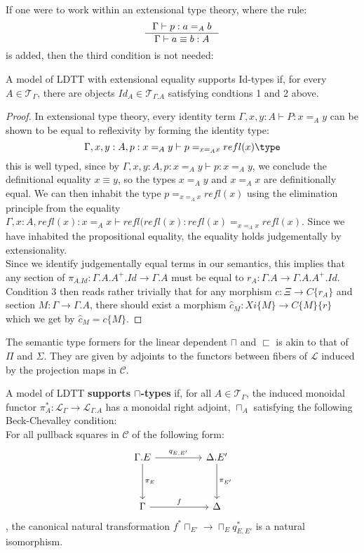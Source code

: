 If one were to work within an extensional type theory, where the rule:
\[
  \inference{\Gamma \vdash p : a =_A b}{\Gamma \vdash a \equiv b : A}
\]
is added, then the third condition is not needed:
\begin{thm}A model of LDTT with extensional equality supports Id-types if, for every $A \in \mathcal{T}_{\Gamma}$, there are objects $Id_A \in \mathcal{T}_{\Gamma.A}$ satisfying condtions 1 and 2 above.
  \begin{proof}
    In extensional type theory, every identity term $\Gamma,x, y : A \vdash P : x =_Ay$ can be shown to be equal to reflexivity by forming the identity type:
    \[
      \Gamma,x,y: A, p : x=_Ay \vdash p =_{x=_Ax}refl(x) \type
    \]
    this is well typed, since by $\Gamma,x,y : A, p : x=_Ay \vdash p : x=_Ay$, we conclude the definitional equality $x \equiv y$, so the types $x=_Ay$ and $x=_Ax$ are definitionally equal. We can then inhabit the type $p =_{x =_Ax}refl(x)$ using the elimination principle from the equality $\Gamma,x : A, refl(x) : x=_Ax \vdash refl(refl(x) : refl(x) =_{x=_Ax}refl(x)$. Since we have inhabited the propositional equality, the equality holds judgementally by extensionality.\\
    Since we identify judgementally equal terms in our semantics, this implies that any section of $\pi_{A.Id} : \Gamma.A.A^+.Id \to \Gamma.A$ must be equal to $r_A : \Gamma.A \to \Gamma.A.A^+.Id$. Condition 3 then reads rather trivially that for any morphism $c : \Xi \to C\{r_A\}$ and section $M : \Gamma \to \Gamma.A$, there should exist a morphism $\hat c_{M} : Xi\{M\} \to C\{M\}\{r\}$ which we get by $\hat c_M = c\{M\}$.
  \end{proof}
\end{thm}
The semantic type formers for the linear dependent $\sqcap$ and $\sqsubset$ is akin to that of $\Pi$ and $\Sigma$. They are given by adjoints to the functors between fibers of $\mathcal{L}$ induced by the projection maps in $\mathcal{C}$.
\begin{defn}
  A model of LDTT \textbf{supports $\sqcap$-types} if, for all $A \in \mathcal{T}_{\Gamma}$, the induced monoidal functor $\pi_A^* : \mathcal{L}_{\Gamma} \to \mathcal{L}_{\Gamma.A}$ has a monoidal right adjoint, $\sqcap_A$ satisfying the following Beck-Chevalley condition:\\
  For all pullback squares in $\mathcal{C}$ of the following form:
  \[
      \ti
    \Gamma.E \ar[d, "\pi_E"] \ar[r, "q_{E, E'}"] & \Delta.E' \ar[d, "\pi_{E'}"] \\
    \Gamma \ar[r, "f"] & \Delta
    \kz
  \],
the canonical natural transformation $f^*\sqcap_{E'} \to \sqcap_{E}q^*_{E, E'}$ is a natural isomorphism.\\
\end{defn}
